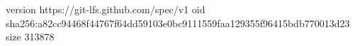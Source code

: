 version https://git-lfs.github.com/spec/v1
oid sha256:a82cc94468f44767f64dd59103e0bc9111559faa129355f96415bdb770013d23
size 313878
